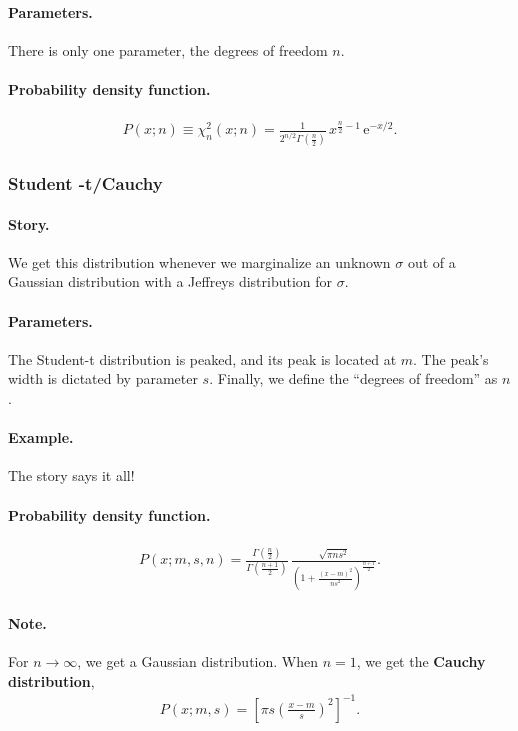 \paragraph{Parameters.} There is only one parameter, the degrees of
freedom $n$.
\paragraph{Probability density function.}
\begin{align}
  P(x;n) \equiv \chi^2_n(x;n) = \frac{1}{2^{n/2}\Gamma\left(\frac{n}{2}\right)}\,
x^{\frac{n}{2}-1}\,\mathrm{e}^{-x/2}.
\end{align}


\subsubsection{Student -t/Cauchy}
\paragraph{Story.}  We get this distribution whenever we marginalize
an unknown $\sigma$ out of a Gaussian distribution with a Jeffreys
distribution for $\sigma$.
\paragraph{Parameters.} The Student-t distribution is peaked, and its
peak is located at $m$.  The peak's width is dictated by parameter
$s$.  Finally, we define the ``degrees of freedom'' as $n$.
\paragraph{Example.} The story says it all!
\paragraph{Probability density function.}
\begin{align}
P(x;m, s, n) = \frac{\Gamma\left(\frac{n}{2}\right)}{\Gamma\left(\frac{n+1}{2}\right)}\,
\frac{\sqrt{\pi n s^2}}{\left(1 + \frac{(x-m)^2}{ns^2}\right)^{\frac{n+1}{2}}}.
\end{align}
\paragraph{Note.} For $n\to \infty$, we get a Gaussian distribution.
When $n = 1$, we get the \textbf{Cauchy distribution},
\begin{align}
P(x;m, s) = \left[\pi s \left(\frac{x-m}{s}\right)^2\right]^{-1}.
\end{align}



